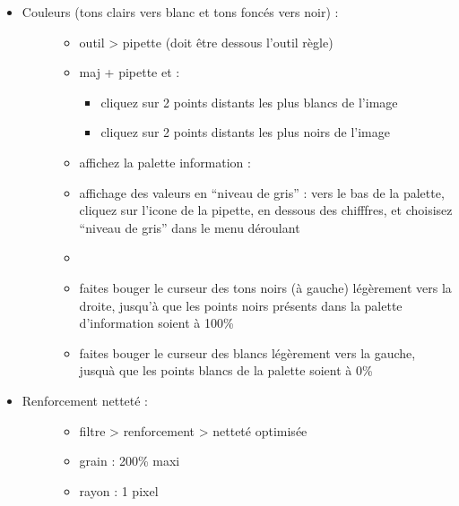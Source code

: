 \documentclass[a4paper,12pt,french]{sphinxmanual}
\begin{document}
\begin{itemize}
\begin{description}
\begin{itemize}
\end{itemize}

\end{description}

\item {} \begin{description}
\item[{Couleurs (tons clairs vers blanc et tons foncés vers noir) :}] \leavevmode\begin{itemize}
\item {} 
outil \textgreater{} pipette (doit être dessous l'outil règle)

\item {} 
maj + pipette et :
\begin{itemize}
\item {} 
cliquez sur 2 points distants les plus blancs de l'image

\item {} 
cliquez sur 2 points distants les plus noirs de l'image

\end{itemize}

\item {} 
affichez la palette information : 

\item {} 
affichage des valeurs en ``niveau de gris'' : vers le bas de la palette, cliquez sur l'icone de la pipette, en dessous des chifffres, et choisisez ``niveau de gris'' dans le menu déroulant

\item {} 

\item {} 
faites bouger le curseur des tons noirs (à gauche) légèrement vers la droite, jusqu'à que les points noirs présents dans la palette d'information soient à 100\%

\item {} 
faites bouger le curseur des blancs légèrement vers la gauche, jusquà que les points blancs de la palette soient à 0\%

\end{itemize}

\end{description}

\item {} \begin{description}
\item[{Renforcement netteté :}] \leavevmode\begin{itemize}
\item {} 
filtre \textgreater{} renforcement \textgreater{} netteté optimisée

\item {} 
grain : 200\% maxi

\item {} 
rayon : 1 pixel

\end{itemize}

\end{description}

\end{itemize}
\end{document}
